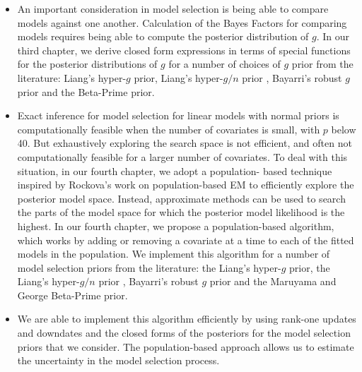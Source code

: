 \begin{itemize}



\item An important consideration in model selection is being able to compare
models against one another.  Calculation of the Bayes Factors for comparing
models requires being able to compute the posterior distribution of $g$. In our
third chapter, we derive closed form expressions in terms of special functions
for the posterior distributions of $g$ for a number of choices of $g$ prior from
the literature: Liang's hyper-$g$ prior, Liang's hyper-$g/n$ prior
\citep{Liang2008}, Bayarri's robust $g$ prior \citep{Bayarri2012} and the
Beta-Prime \citep{Maruyama2011} prior.


\item Exact inference for model selection for linear models with normal priors
is computationally feasible when the number of  covariates is small, with $p$
below 40. But exhaustively exploring the search space is not efficient, and
often not computationally feasible for a larger number of covariates. To deal
with this situation, in our fourth chapter, we adopt a population- based
technique inspired by Rockova's work on population-based EM to efficiently
explore the posterior model space. Instead, approximate methods can be used to
search the parts of the model space for which the posterior model likelihood is
the highest. In our fourth chapter, we propose a population-based algorithm, which
works by adding or removing a covariate at a time to each of the fitted models
in the population. We implement this algorithm for a number of model selection
priors from the literature: the Liang's hyper-$g$ prior, the Liang's hyper-$g/n$
prior \citep{Liang2008}, Bayarri's robust $g$ prior \citep{Bayarri2012} and the
Maruyama and George Beta-Prime \citep{Maruyama2011} prior.


\item We are able to implement this algorithm efficiently by using rank-one
updates and downdates and the closed forms of the posteriors for the model
selection priors that we consider. The population-based approach allows us to
estimate the uncertainty in the model selection process.

\end{itemize}
